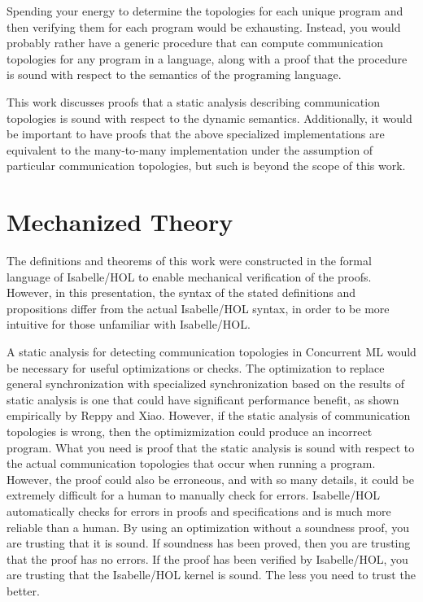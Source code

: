 \documentclass[letterpaper, 11pt]{report}
\begin{document}
Spending your energy to determine the topologies for each unique program and then verifying
them for each program would be exhausting. Instead, you would probably rather have a generic
procedure that can compute communication topologies for any program in a language, along with
a proof that the procedure is sound with respect to the semantics of the programing language.

This work discusses proofs that a static analysis describing communication topologies is
sound with respect to the dynamic semantics.
Additionally, it would be important to have proofs that the above specialized
implementations are equivalent to the many-to-many implementation under the assumption of
particular communication topologies, but such is beyond the scope of this work.

\section{Mechanized Theory}

The definitions and theorems of this work were constructed in the formal
language of Isabelle/HOL to enable mechanical verification of the proofs.
However, in this presentation, the syntax of the stated definitions and propositions differ from
the actual Isabelle/HOL syntax, in order to be more intuitive for those unfamiliar with Isabelle/HOL.

A static analysis for detecting communication topologies in Concurrent ML would be necessary for useful
optimizations or checks. The optimization to replace general synchronization with specialized synchronization
based on the results of static analysis is one that could have significant performance benefit, as shown
empirically by Reppy and Xiao. However, if the static analysis of communication topologies is wrong, then
the optimizmization could produce an incorrect program. What you need is proof that the static analysis is sound
with respect to the actual communication topologies that occur when running a program. However, the proof could also be
erroneous, and with so many details, it could be extremely difficult for a human to manually check for errors.
Isabelle/HOL automatically checks for errors in proofs and specifications and is much more reliable than a
human. By using an optimization without a soundness proof, you are trusting that it is sound. If soundness has
been proved, then you are trusting that the proof has no errors. If the proof has been verified by Isabelle/HOL, 
you are trusting that the Isabelle/HOL kernel is sound. The less you need to trust the better.
\end{document}

